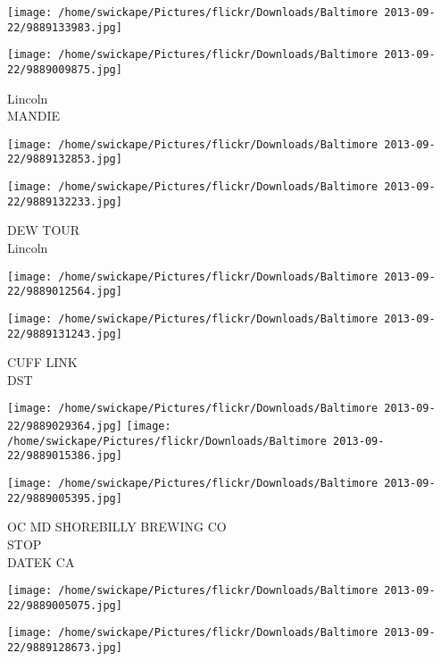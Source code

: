 \documentclass[10pt,letterpaper]{article}
\begin{document}
\texttt{[image: /home/swickape/Pictures/flickr/Downloads/Baltimore 2013-09-22/9889133983.jpg]}

\vspace{0.25in}
\texttt{[image: /home/swickape/Pictures/flickr/Downloads/Baltimore 2013-09-22/9889009875.jpg]}

Lincoln\\
MANDIE\\
\pagebreak

\texttt{[image: /home/swickape/Pictures/flickr/Downloads/Baltimore 2013-09-22/9889132853.jpg]}

\vspace{0.25in}
\texttt{[image: /home/swickape/Pictures/flickr/Downloads/Baltimore 2013-09-22/9889132233.jpg]}

DEW TOUR\\
Lincoln\\
\pagebreak

\texttt{[image: /home/swickape/Pictures/flickr/Downloads/Baltimore 2013-09-22/9889012564.jpg]}

\vspace{0.25in}
\texttt{[image: /home/swickape/Pictures/flickr/Downloads/Baltimore 2013-09-22/9889131243.jpg]}

CUFF LINK\\
DST\\
\pagebreak

\texttt{[image: /home/swickape/Pictures/flickr/Downloads/Baltimore 2013-09-22/9889029364.jpg]}
\texttt{[image: /home/swickape/Pictures/flickr/Downloads/Baltimore 2013-09-22/9889015386.jpg]}

\vspace{0.25in}
\texttt{[image: /home/swickape/Pictures/flickr/Downloads/Baltimore 2013-09-22/9889005395.jpg]}

OC MD SHOREBILLY BREWING CO\\
STOP\\
DATEK CA\\
\pagebreak

\texttt{[image: /home/swickape/Pictures/flickr/Downloads/Baltimore 2013-09-22/9889005075.jpg]}

\vspace{0.25in}
\texttt{[image: /home/swickape/Pictures/flickr/Downloads/Baltimore 2013-09-22/9889128673.jpg]}
\end{document}
